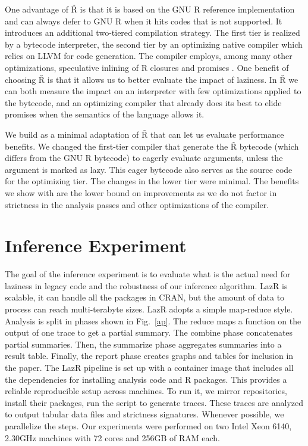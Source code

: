 \documentclass[review,creen,acmsmall]{acmart}
\newcommand{\lazr}{{\sf LazR}\xspace}
\renewcommand{\Rsh}{{\sf\v R}\xspace}
\begin{document}
One advantage of \Rsh is that it is based on the GNU R reference implementation
and can always defer to GNU R when it hits codes that is not supported. It
introduces an additional two-tiered compilation strategy. The first tier is
realized by a bytecode interpreter, the second tier by an optimizing native
compiler which relies on LLVM for code generation. The compiler employs, among
many other optimizations, speculative inlining of R closures and promises
\citep{dls19, oopsla20c}.
One benefit of choosing \Rsh is that it allows us to better evaluate the impact
of laziness. In \Rsh we can both measure the impact on an interpreter with few
optimizations applied to the bytecode, and an optimizing compiler that already
does its best to elide promises when the semantics of the language allows it.

We build \rshstrict as a minimal adaptation of \Rsh that can let us evaluate
performance benefits. We changed the first-tier compiler that generate the \Rsh
bytecode (which differs from the GNU R bytecode) to eagerly evaluate arguments,
unless the argument is marked as lazy. This eager bytecode also serves as the
source code for the optimizing tier.  The changes in the lower tier were minimal.
The benefits we show with \rshstrict are the lower bound on improvements as we
do not factor in strictness in the analysis passes and other optimizations of
the compiler.

\section{Inference Experiment}

The goal of the inference experiment is to evaluate what is the actual need for
laziness in legacy code and the robustness of our inference algorithm.
\lazr is scalable, it can handle all the packages in CRAN, but the amount of
data to process can reach multi-terabyte sizes. \lazr adopts a simple map-reduce
style. Analysis is split in phases shown in Fig.~\ref{ap}. The reduce maps a
function on the output of one trace to get a partial summary. The combine phase
concatenates partial summaries. Then, the summarize phase aggregates summaries
into a result table. Finally, the report phase creates graphs and tables for
inclusion in the paper. The \lazr pipeline is set up with a container image that
includes all the dependencies for installing analysis code and R packages. This
provides a reliable reproducible setup across machines. To run it, we mirror
repositories, install their packages, run the script to generate traces. These
traces are analyzed to output tabular data files and strictness signatures.
Whenever possible, we parallelize the steps. Our experiments were performed on
two Intel Xeon 6140, 2.30GHz machines with 72 cores and 256GB of RAM each.
\end{document}
